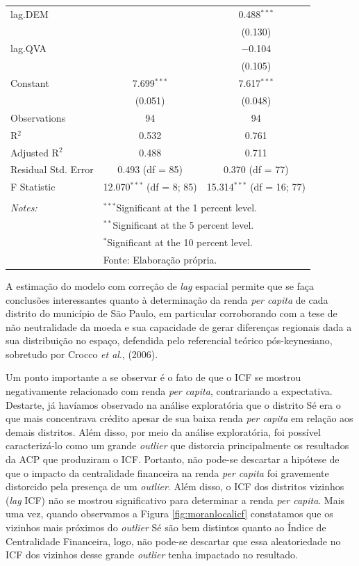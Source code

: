 \documentclass[a4paper,12pt]{article}
\begin{document}
\begin{table}[!htbp]
\begin{tabular}{@{\extracolsep{5pt}}lcc}
  lag.DEM &  & 0.488$^{***}$ \\ 
  &  & (0.130) \\ 
  lag.QVA &  & $-$0.104 \\ 
  &  & (0.105) \\ 
  Constant & 7.699$^{***}$ & 7.617$^{***}$ \\ 
  & (0.051) & (0.048) \\ 
 Observations & 94 & 94 \\ 
R$^{2}$ & 0.532 & 0.761 \\ 
Adjusted R$^{2}$ & 0.488 & 0.711 \\ 
Residual Std. Error & 0.493 (df = 85) & 0.370 (df = 77) \\ 
F Statistic & 12.070$^{***}$ (df = 8; 85) & 15.314$^{***}$ (df = 16; 77) \\ 
\hline \\[-1.8ex] 
\textit{Notes:} & \multicolumn{2}{l}{$^{***}$Significant at the 1 percent level.} \\ 
 & \multicolumn{2}{l}{$^{**}$Significant at the 5 percent level.} \\ 
 & \multicolumn{2}{l}{$^{*}$Significant at the 10 percent level.} \\ 
 & \multicolumn{2}{l}{Fonte: Elaboração própria.} \\ 
\end{tabular} 
\end{table}

\newpage

A estimação do modelo com correção de \emph{lag} espacial permite que se
faça conclusões interessantes quanto à determinação da renda \emph{per
capita} de cada distrito do município de São Paulo, em particular
corroborando com a tese de não neutralidade da moeda e sua capacidade de
gerar diferenças regionais dada a sua distribuição no espaço, defendida
pelo referencial teórico pós-keynesiano, sobretudo por Crocco \emph{et
al}., (2006).

Um ponto importante a se observar é o fato de que o ICF se mostrou
negativamente relacionado com renda \emph{per capita}, contrariando a
expectativa. Destarte, já havíamos observado na análise exploratória que
o distrito Sé era o que mais concentrava crédito apesar de sua baixa
renda \emph{per capita} em relação aos demais distritos. Além disso, por
meio da análise exploratória, foi possível caracterizá-lo como um grande
\emph{outlier} que distorcia principalmente os resultados da ACP que
produziram o ICF. Portanto, não pode-se descartar a hipótese de que o
impacto da centralidade financeira na renda \emph{per capita} foi
gravemente distorcido pela presença de um \emph{outlier}. Além disso, o
ICF dos distritos vizinhos (\emph{lag} ICF) não se mostrou significativo
para determinar a renda \emph{per capita}. Mais uma vez, quando
observamos a Figura \ref{fig:moranlocalicf} constatamos que os vizinhos
mais próximos do \emph{outlier} Sé são bem distintos quanto ao Índice de
Centralidade Financeira, logo, não pode-se descartar que essa
aleatoriedade no ICF dos vizinhos desse grande \emph{outlier} tenha
impactado no resultado.
\end{document}
